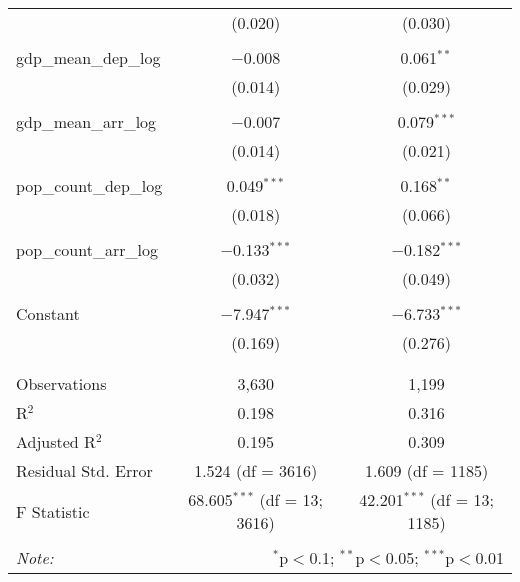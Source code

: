 \begin{table}[!htbp]
\begin{tabular}{@{\extracolsep{5pt}}lcc}
  & (0.020) & (0.030) \\ 
  & & \\ 
 gdp\_mean\_dep\_log & $-$0.008 & 0.061$^{**}$ \\ 
  & (0.014) & (0.029) \\ 
  & & \\ 
 gdp\_mean\_arr\_log & $-$0.007 & 0.079$^{***}$ \\ 
  & (0.014) & (0.021) \\ 
  & & \\ 
 pop\_count\_dep\_log & 0.049$^{***}$ & 0.168$^{**}$ \\ 
  & (0.018) & (0.066) \\ 
  & & \\ 
 pop\_count\_arr\_log & $-$0.133$^{***}$ & $-$0.182$^{***}$ \\ 
  & (0.032) & (0.049) \\ 
  & & \\ 
 Constant & $-$7.947$^{***}$ & $-$6.733$^{***}$ \\ 
  & (0.169) & (0.276) \\ 
  & & \\ 
\hline \\[-1.8ex] 
Observations & 3,630 & 1,199 \\ 
R$^{2}$ & 0.198 & 0.316 \\ 
Adjusted R$^{2}$ & 0.195 & 0.309 \\ 
Residual Std. Error & 1.524 (df = 3616) & 1.609 (df = 1185) \\ 
F Statistic & 68.605$^{***}$ (df = 13; 3616) & 42.201$^{***}$ (df = 13; 1185) \\ 
\hline 
\hline \\[-1.8ex] 
\textit{Note:}  & \multicolumn{2}{r}{$^{*}$p$<$0.1; $^{**}$p$<$0.05; $^{***}$p$<$0.01} \\ 
\end{tabular} 
\end{table} 
